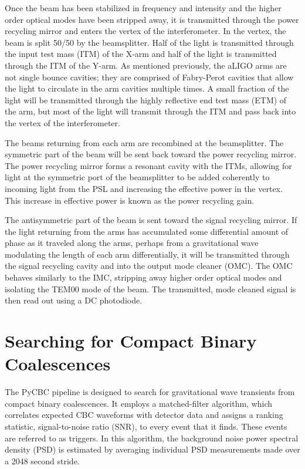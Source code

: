 Once the beam has been stabilized in frequency and intensity and the higher order 
optical modes have been stripped away, it is transmitted through the power 
recycling mirror and enters the vertex of the interferometer. In the vertex, 
the beam is split 50/50 by the beamsplitter. Half of the light is transmitted 
through the input test mass (ITM) of the X-arm and half of the light is transmitted 
through the ITM of the Y-arm. As mentioned previously, the aLIGO arms are not 
single bounce cavities; they are comprised of Fabry-Perot cavities that allow the 
light to circulate in the arm cavities multiple times. A small fraction of the 
light will be transmitted through the highly reflective end test mass (ETM) 
of the arm, but most of the light will transmit through the ITM and pass 
back into the vertex of the interferometer. 

The beams returning from each arm are recombined at the beamsplitter. The 
symmetric part of the beam 
will be sent back toward the power recycling mirror. The power recycling mirror 
forms a resonant cavity with the ITMs, allowing for light at the symmetric 
port of the beamsplitter to be added coherently to incoming light from the PSL and 
increasing the effective power in the vertex. This increase in effective power 
is known as the power recycling gain. 

The antisymmetric part of the beam is sent toward the signal recycling mirror. 
If the light returning from the arms has accumulated some differential amount of 
phase as it traveled 
along the arms, perhaps from a gravitational wave modulating the length of each 
arm differentially, it will be transmitted through the signal recycling cavity 
and into the output mode cleaner (OMC). The OMC behaves similarly to the IMC, 
stripping away higher order optical modes and isolating the TEM00 mode of the 
beam. The transmitted, mode cleaned signal is then read out using a DC 
photodiode.

\section{Searching for Compact Binary Coalescences}

The PyCBC pipeline is designed to search for gravitational wave transients from compact binary
coalescences. It employs a matched-filter algorithm, which correlates
expected CBC
waveforms with detector data and assigns a ranking statistic, signal-to-noise ratio (SNR),
to every event that it finds. These events are referred to as triggers. In this algorithm,
the background noise power spectral density (PSD) is estimated by averaging individual
PSD measurements made over a 2048 second stride.

